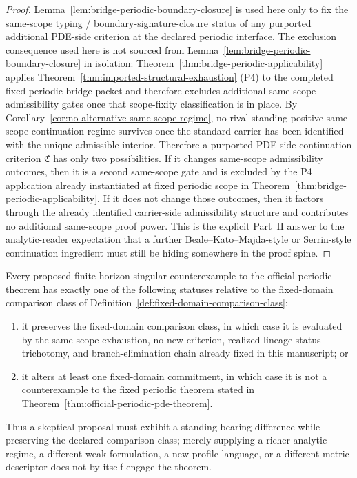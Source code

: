 \begin{proof}
Lemma~\ref{lem:bridge-periodic-boundary-closure} is used here only to fix the same-scope typing /
boundary-signature-closure status of any purported additional PDE-side criterion at the declared
periodic interface. The exclusion consequence used here is not sourced from Lemma~\ref{lem:bridge-periodic-boundary-closure} in isolation: Theorem~\ref{thm:bridge-periodic-applicability} applies
Theorem~\ref{thm:imported-structural-exhaustion} (P4) to the completed fixed-periodic bridge
packet and therefore excludes additional same-scope admissibility gates once that scope-fixity
classification is in place. By Corollary~\ref{cor:no-alternative-same-scope-regime}, no rival
standing-positive same-scope continuation regime survives once the standard carrier has been
identified with the unique admissible interior. Therefore a purported PDE-side continuation criterion
$\mathfrak C$ has only two possibilities. If it changes same-scope admissibility outcomes, then it is a
second same-scope gate and is excluded by the P4 application already instantiated at fixed periodic
scope in Theorem~\ref{thm:bridge-periodic-applicability}. If it does not change those outcomes,
then it factors through the already identified carrier-side admissibility structure and contributes no
additional same-scope proof power. This is the explicit Part~II answer to the analytic-reader expectation
that a further Beale--Kato--Majda-style or Serrin-style continuation ingredient must still be hiding
somewhere in the proof spine.
\end{proof}


\begin{manualproposition}
\label{prop:fixed-domain-counterexample-burden}
Every proposed finite-horizon singular counterexample to the official periodic theorem has exactly one of the following statuses relative to the fixed-domain comparison class of Definition~\ref{def:fixed-domain-comparison-class}:
\begin{enumerate}[label=(\roman*), leftmargin=2.2em]
\item it preserves the fixed-domain comparison class, in which case it is evaluated by the same-scope exhaustion, no-new-criterion, realized-lineage status-trichotomy, and branch-elimination chain already fixed in this manuscript; or
\item it alters at least one fixed-domain commitment, in which case it is not a counterexample to the fixed periodic theorem stated in Theorem~\ref{thm:official-periodic-pde-theorem}.
\end{enumerate}
Thus a skeptical proposal must exhibit a standing-bearing difference while preserving the declared comparison class; merely supplying a richer analytic regime, a different weak formulation, a new profile language, or a different metric descriptor does not by itself engage the theorem.
\end{manualproposition}

